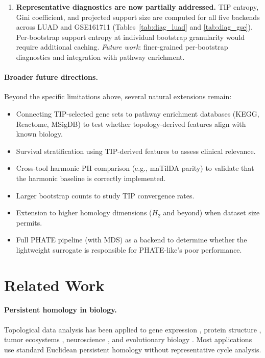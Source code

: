 \documentclass[11pt]{article}
\begin{document}
\begin{enumerate}[leftmargin=1.5em]
\item \textbf{Representative diagnostics are now partially addressed.}
TIP entropy, Gini coefficient, and projected support size are computed for all five backends across LUAD and GSE161711 (Tables~\ref{tab:diag_luad} and \ref{tab:diag_gse}).
Per-bootstrap support entropy at individual bootstrap granularity would require additional caching.
\emph{Future work}: finer-grained per-bootstrap diagnostics and integration with pathway enrichment.
\end{enumerate}

\paragraph{Broader future directions.}
Beyond the specific limitations above, several natural extensions remain:
\begin{itemize}[leftmargin=1.5em]
\item Connecting TIP-selected gene sets to pathway enrichment databases (KEGG, Reactome, MSigDB) to test whether topology-derived features align with known biology.
\item Survival stratification using TIP-derived features to assess clinical relevance.
\item Cross-tool harmonic PH comparison (e.g., maTilDA parity) to validate that the harmonic baseline is correctly implemented.
\item Larger bootstrap counts to study TIP convergence rates.
\item Extension to higher homology dimensions ($H_2$ and beyond) when dataset size permits.
\item Full PHATE pipeline (with MDS) as a backend to determine whether the lightweight surrogate is responsible for PHATE-like's poor performance.
\end{itemize}

\section{Related Work}
\label{sec:related}

\paragraph{Persistent homology in biology.}
Topological data analysis has been applied to gene expression \cite{rizvi2017}, protein structure \cite{xia2014}, tumor ecosystems \cite{vipond2021}, neuroscience \cite{giusti2015}, and evolutionary biology \cite{chan2013topology}.
Most applications use standard Euclidean persistent homology without representative cycle analysis.
\end{document}
